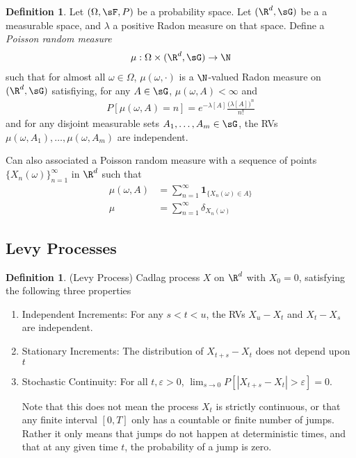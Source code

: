 \documentclass[12pt]{article}
\theoremstyle{plain}
\theoremstyle{definition}
\newtheorem{defn}[thm]{Definition}
\theoremstyle{remark}
\newcommand{\ra}{\rightarrow}
\newcommand{\sumninf}{\sum^\infty_{n=1}}
\newcommand{\ninf}{_{n=1}^\infty}
\begin{document}
\begin{defn}
Let $(\Omega,\sF,P)$ be a probability space.
Let $(\R^d,\sG)$ be a a measurable space, and $\lambda$ a positive Radon
measure on that space.
Define a \emph{Poisson random measure}
\begin{align*}
  \mu:\Omega\times(\R^d,\sG)\ra \N
\end{align*}
such that for almost all $\omega\in\Omega$,
$\mu(\omega,\cdot)$ is a $\N$-valued Radon measure on $(\R^d,\sG)$
satisfiying, for any $A\in\sG$,
$\mu(\omega,A)<\infty$ and
\begin{align*}
  P[\mu(\omega,A)=n]
  =
  e^{-\lambda[A]}
  \frac{\big(\lambda[A]\big)^n}{n!}
\end{align*}
and for any disjoint measurable sets $A_1,\ldots,A_m\in\sG$, the RVs
$\mu(\omega,A_1),\ldots,\mu(\omega,A_m)$ are independent.

Can also associated a Poisson random measure with a sequence of points
$\{X_n(\omega)\}\ninf$ in $\R^d$ such that
\begin{align*}
  \mu(\omega,A)
  &=
  \sumninf \mathbf{1}_{\{X_n(\omega)\in A\}}
  \\
  \mu
  &=
  \sumninf \delta_{X_n(\omega)}
\end{align*}
\end{defn}

\clearpage
\subsection{Levy Processes}

\begin{defn}(Levy Process)
Cadlag process $X$ on $\R^d$ with $X_0=0$, satisfying the following three
properties
\begin{enumerate}[label=(\roman*)]
  \item Independent Increments:
    For any $s<t<u$, the RVs
    $X_u-X_t$ and $X_t-X_s$ are independent.
  \item Stationary Increments:
    The distribution of $X_{t+s}-X_t$ does not depend upon $t$
  \item Stochastic Continuity:
    For all $t,\varepsilon>0$,
    $\lim_{s\ra 0} P[|X_{t+s}-X_t|>\varepsilon]=0$.

    Note that this does not mean the process $X_t$ is strictly
    continuous, or that any finite interval $[0,T]$ only has a countable
    or finite number of jumps.
    Rather it only means that jumps do not happen at deterministic
    times, and that at any given time $t$, the probability of a jump is
    zero.
\end{enumerate}
\end{defn}




\end{document}
